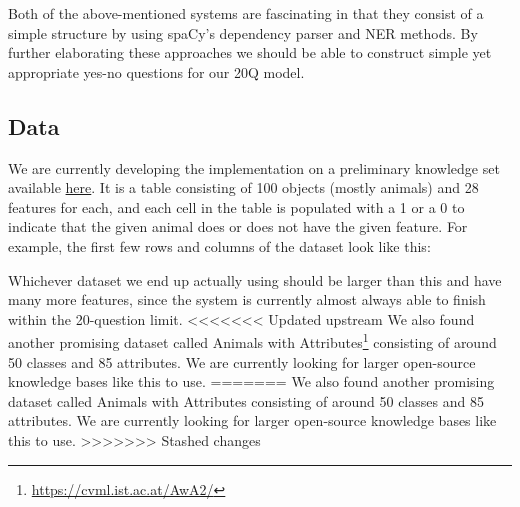 \documentclass[a4paper,12pt]{article}
\begin{document}
Both of the above-mentioned systems are fascinating in that they consist of a simple structure by using spaCy’s dependency parser and NER methods. 
By further elaborating these approaches we should be able to construct simple yet appropriate yes-no questions for our 20Q model.

\subsection*{Data}
We are currently developing the implementation on a preliminary knowledge set available \href{https://github.com/drdevinhopkins/20_Questions/blob/master/knowledge_base.csv}{here}.
It is a table consisting of 100 objects (mostly animals) and 28 features for each, and each cell in the table is populated with a 1 or a 0 to indicate that the given animal does or does not have the given feature.
For example, the first few rows and columns of the dataset look like this:


Whichever dataset we end up actually using should be larger than this and have many more features, since the system is currently almost always able to finish within the 20-question limit.
<<<<<<< Updated upstream
We also found another promising dataset called Animals with Attributes\footnote{\url{https://cvml.ist.ac.at/AwA2/}} consisting of around 50 classes and 85 attributes. We are currently looking for larger open-source knowledge bases like this to use.
=======
We also found another promising dataset called Animals with Attributes%
 consisting of around 50 classes and 85 attributes. 
 We are currently looking for larger open-source knowledge bases like this to use.
>>>>>>> Stashed changes
\end{document}
